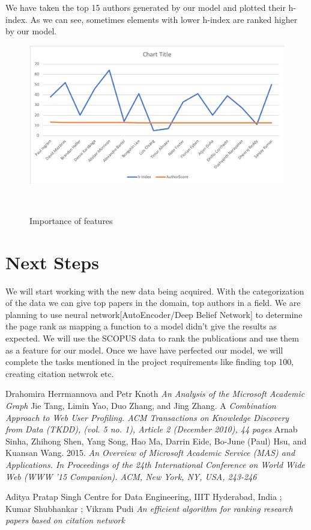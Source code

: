 \documentclass[a4paper, 11pt]{article}
\begin{document}
We have taken the top 15 authors generated by our model and plotted their h-index. As we can see, sometimes elements with lower h-index are ranked higher by our model.
\begin{figure}[ht]
  \includegraphics[width=1\columnwidth]{Picture1.png}
  \caption{Importance of features}~\label{fig:Importance of featires}
\end{figure}
\FloatBarrier


\section*{Next Steps}
We will start working with the new data being acquired. With the categorization of the data we can give top papers in the domain, top authors in a field. We are planning to use neural network[AutoEncoder/Deep Belief Network] to determine the page rank as mapping a function to a model didn't give the results as expected. We will use the SCOPUS data to rank the publications and use them as a feature for our model. Once we have have perfected our model, we will complete the tasks mentioned in the project requirements like finding top 100, creating citation netwrok etc.




\begin{thebibliography}{9}
Drahomira Herrmannova and Petr Knoth \emph{An Analysis of the Microsoft Academic Graph
}
Jie Tang, Limin Yao, Duo Zhang, and Jing Zhang. A \emph{ Combination Approach to Web User Profiling. ACM Transactions on Knowledge Discovery from Data (TKDD), (vol. 5 no. 1), Article 2 (December 2010), 44 pages}
Arnab Sinha, Zhihong Shen, Yang Song, Hao Ma, Darrin Eide, Bo-June (Paul) Hsu, and Kuansan Wang. 2015. \emph{An Overview of Microsoft Academic Service (MAS) and Applications. In Proceedings of the 24th International Conference on World Wide Web (WWW ’15 Companion). ACM, New York, NY, USA, 243-246}

Aditya Pratap Singh 
Centre for Data Engineering, IIIT Hyderabad, India
; Kumar Shubhankar ; Vikram Pudi \emph{An efficient algorithm for ranking research papers based on citation network
}

\end{thebibliography}
\end{document}
